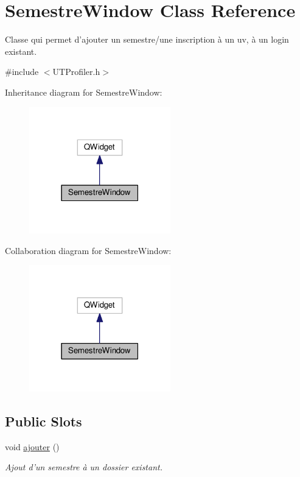 \hypertarget{class_semestre_window}{\section{Semestre\-Window Class Reference}
\label{class_semestre_window}
}


Classe qui permet d'ajouter un semestre/une inscription à un uv, à un login existant.  




{\ttfamily \#include $<$U\-T\-Profiler.\-h$>$}



Inheritance diagram for Semestre\-Window\-:
\nopagebreak
\begin{figure}[H]
\begin{center}
\leavevmode
\includegraphics[width=174pt]{class_semestre_window__inherit__graph}
\end{center}
\end{figure}


Collaboration diagram for Semestre\-Window\-:
\nopagebreak
\begin{figure}[H]
\begin{center}
\leavevmode
\includegraphics[width=174pt]{class_semestre_window__coll__graph}
\end{center}
\end{figure}
\subsection*{Public Slots}
\begin{DoxyCompactItemize}
\item 
void \hyperlink{class_semestre_window_aa7f626a4477fdd49811dcd55be412498}{ajouter} ()
\begin{DoxyCompactList}\small\item\em Ajout d'un semestre à un dossier existant. \end{DoxyCompactList}\end{DoxyCompactItemize}
